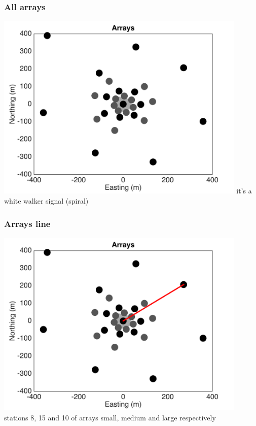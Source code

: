 \documentclass{beamer}
\begin{document}
\frame
{
\frametitle{{\bf All arrays}}
\centering
\includegraphics[width=0.9\textwidth]{../pics/arrays.png}
\vfill
it's a white walker signal (spiral)
}
\frame
{
\frametitle{{\bf Arrays line}}
\centering
\includegraphics[width=0.9\textwidth]{../pics/arrays-line.png}
\vfill
stations 8, 15 and 10 of arrays small, medium and large respectively
}
\end{document}
